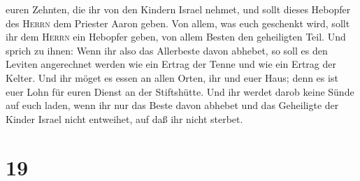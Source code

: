 euren Zehnten, die ihr von den Kindern Israel nehmet, und sollt dieses
Hebopfer des \textsc{Herrn} dem Priester Aaron geben. 
Von allem, was euch geschenkt wird, sollt ihr dem \textsc{Herrn} ein
Hebopfer geben, von allem Besten den geheiligten Teil. 
Und sprich zu ihnen: Wenn ihr also das Allerbeste davon abhebet, so soll
es den Leviten angerechnet werden wie ein Ertrag der Tenne und wie ein
Ertrag der Kelter.  Und ihr möget es essen an allen
Orten, ihr und euer Haus; denn es ist euer Lohn für euren Dienst an der
Stiftshütte.  Und ihr werdet darob keine Sünde auf euch
laden, wenn ihr nur das Beste davon abhebet und das Geheiligte der
Kinder Israel nicht entweihet, auf daß ihr nicht sterbet.

\hypertarget{section-18}{%
\section{19}\label{section-18}}

